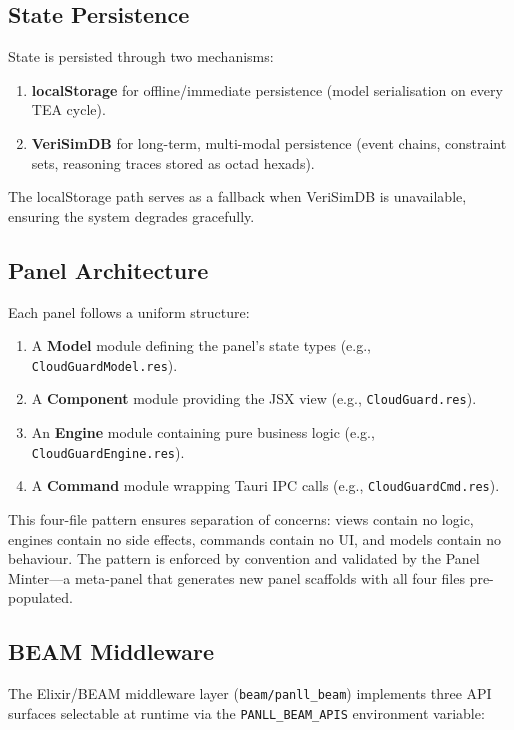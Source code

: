 \documentclass[11pt,a4paper]{article}
\newcommand{\tea}{\textsc{TEA}}
\begin{document}
\subsection{State Persistence}

State is persisted through two mechanisms:
\begin{enumerate}
  \item \textbf{localStorage} for offline/immediate persistence
    (model serialisation on every \tea{} cycle).
  \item \textbf{VeriSimDB} for long-term, multi-modal persistence
    (event chains, constraint sets, reasoning traces stored as
    octad hexads).
\end{enumerate}

The localStorage path serves as a fallback when VeriSimDB is
unavailable, ensuring the system degrades gracefully.

\subsection{Panel Architecture}

Each panel follows a uniform structure:
\begin{enumerate}
  \item A \textbf{Model} module defining the panel's state types
    (e.g., \texttt{CloudGuardModel.res}).
  \item A \textbf{Component} module providing the JSX view
    (e.g., \texttt{CloudGuard.res}).
  \item An \textbf{Engine} module containing pure business logic
    (e.g., \texttt{CloudGuardEngine.res}).
  \item A \textbf{Command} module wrapping Tauri IPC calls
    (e.g., \texttt{CloudGuardCmd.res}).
\end{enumerate}

This four-file pattern ensures separation of concerns: views contain
no logic, engines contain no side effects, commands contain no UI,
and models contain no behaviour. The pattern is enforced by
convention and validated by the Panel Minter---a meta-panel that
generates new panel scaffolds with all four files pre-populated.

\subsection{BEAM Middleware}

The Elixir/BEAM middleware layer (\texttt{beam/panll\_beam})
implements three API surfaces selectable at runtime via the
\texttt{PANLL\_BEAM\_APIS} environment variable:
\end{document}
